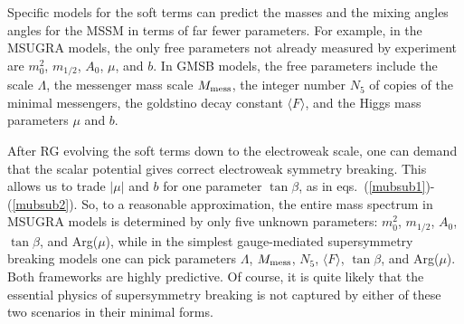\documentclass[12pt]{article}
\def\nmess{N_5}
\begin{document}
Specific models for the soft 
terms can predict the masses and the mixing angles angles for the 
MSSM in terms of far fewer parameters. For example, 
in the MSUGRA models, the only free 
parameters not already measured by 
experiment are $m_0^2$, $m_{1/2}$, $A_0$, $\mu$, and $b$. In 
GMSB models, the free parameters include 
the scale $\Lambda$, the messenger mass scale $M_{\rm mess}$, 
the integer number $\nmess$ of copies of the minimal messengers, 
the goldstino decay constant $\langle F \rangle $, and the Higgs mass 
parameters $\mu$ and $b$. 

After RG evolving the soft terms down to the 
electroweak scale, one can demand that the scalar potential gives correct 
electroweak symmetry breaking. This allows us to trade $|\mu|$ and $b$ 
for one parameter $\tan\beta$, as in 
eqs.~(\ref{mubsub1})-(\ref{mubsub2}). So, to a reasonable approximation, 
the entire mass spectrum in MSUGRA models is determined by 
only five unknown parameters: $m_0^2$, $m_{1/2}$, $A_0$, $\tan\beta$, and 
Arg($\mu$), while in the simplest gauge-mediated supersymmetry breaking 
models one can pick parameters $\Lambda$, $M_{\rm mess}$, $\nmess$, 
$\langle F \rangle $, $\tan\beta$, and Arg($\mu$). Both frameworks are 
highly predictive. Of course, it is quite likely that the essential 
physics of supersymmetry breaking is not captured by either of these two 
scenarios in their minimal forms. 
\end{document}
